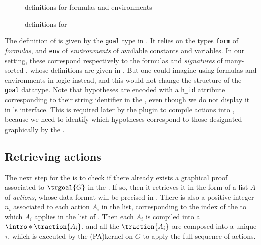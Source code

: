 \begin{figure}
  
  \caption{ definitions for  formulas and environments}
\end{figure}

\begin{figure}
  
  \caption{ definitions for }
\end{figure}

The  definition of  is given by the \texttt{goal} type in
. It relies on
the  types \texttt{form} of \emph{formulas}, and \texttt{env} of
\emph{environments} of available constants and variables. In our setting, these
correspond respectively to the formulas and \emph{signatures} of many-sorted
, whose  definitions are given in . But
one could imagine using formulas and environments in  logic
instead, and this would not change the structure of the \texttt{goal} datatype.
Note that hypotheses are encoded with a \texttt{h\_id} attribute corresponding
to their string identifier in the  , even though we do not
display it in 's interface. This is required later by the plugin to
compile actions into , because we need to identify which 
hypotheses correspond to those designated graphically by the .

\subsection{Retrieving actions}

\AP
The next step for the  is to check if there already exists a
graphical proof associated to $\trgoal{G}$ in the . If so,
then it retrieves it in the form of a list $A$ of \emph{actions}, whose data
format will be precised in . There is also a positive
integer $n_i$ associated to each action $A_i$ in the list, corresponding to the
index of the  to which $A_i$ applies in the list of . Then
each $A_i$ is compiled into a  $\intro*\traction{A_i}$, and all the
$\traction{A_i}$ are composed into a unique  $\tau$, which is
executed by the \kl(PA){kernel} on $G$ to apply the full sequence of actions.

